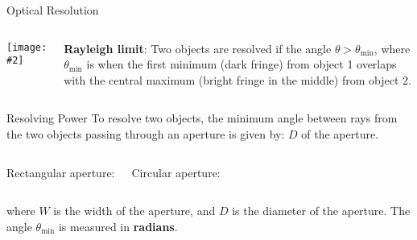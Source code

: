 \documentclass[compress,aspectratio=169]{beamer}
\newcommand{\pic}[2]{\texttt{[image: \#2]}}
\newcommand{\eq}[2]{\vspace{#1}{\LARGE\begin{displaymath}#2\end{displaymath}}}
\begin{document}
\begin{frame}{Optical Resolution}
  \begin{columns}
    \pic{1}{graphics/resolve4.png}

    \textbf{Rayleigh limit}: Two objects are resolved if the angle
      $\theta>\theta_\mathrm{min}$, where $\theta_\mathrm{min}$ is when the first
      minimum (dark fringe) from object 1 overlaps with the central maximum
      (bright fringe in the middle) from object 2.
  \end{columns}
\end{frame}


\begin{frame}{Resolving Power}
  To resolve two objects, the minimum angle between rays from the two objects
  passing through an aperture is given by:
  $D$ of the aperture.
  \vspace{0.2in}
  \begin{columns}
    Rectangular aperture:

    \eq{-.2in}{
      \boxed{\theta_\mathrm{min}=\frac{\lambda}{W}}
    }
    Circular aperture:

    \eq{-.2in}{
      \boxed{\theta_\mathrm{min}=\frac{1.22\lambda}{D}}
    }
  \end{columns}
  where $W$ is the width of the aperture, and $D$ is the diameter of the
  aperture. The angle $\theta_\mathrm{min}$ is measured in \textbf{radians}.
\end{frame}
\end{document}
